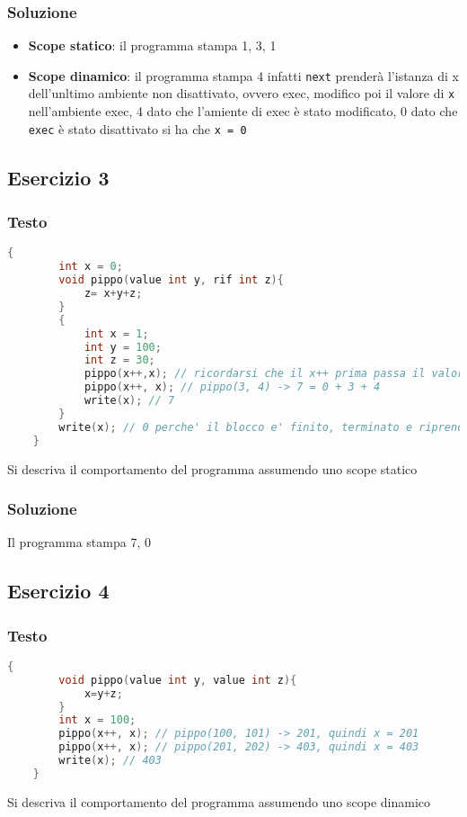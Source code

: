\subsubsection{Soluzione}
\begin{itemize}
    \item \textbf{Scope statico}: il programma stampa 1, 3, 1
    \item \textbf{Scope dinamico}: il programma stampa 4 infatti \texttt{next} prenderà l'istanza di x dell'unltimo ambiente non disattivato, ovvero exec, modifico poi il valore di \texttt{x} nell'ambiente exec, 4 dato che l'amiente di exec è stato modificato, 0 dato che \texttt{exec} è stato disattivato si ha che \texttt{x = 0}
\end{itemize}

\subsection{Esercizio 3}
\subsubsection{Testo}
\begin{lstlisting}[language=C]
    {
        int x = 0;
        void pippo(value int y, rif int z){
            z= x+y+z;
        }
        {
            int x = 1;
            int y = 100;
            int z = 30;
            pippo(x++,x); // ricordarsi che il x++ prima passa il valore di x nudo e crudo poi come side-effect modica x staticamente in questo caso, pertanto il secondo parametro sara' 2: pippo(1, 2) -> 3 = 0+ 1 +2
            pippo(x++, x); // pippo(3, 4) -> 7 = 0 + 3 + 4
            write(x); // 7
        }
        write(x); // 0 perche' il blocco e' finito, terminato e riprende la variabile x dichiarata all'inizio
    }
\end{lstlisting}
Si descriva il comportamento del programma assumendo uno scope statico

\subsubsection{Soluzione}
Il programma stampa 7, 0

\subsection{Esercizio 4}
\subsubsection{Testo}
\begin{lstlisting}[language=C]
    {
        void pippo(value int y, value int z){
            x=y+z;
        }
        int x = 100;
        pippo(x++, x); // pippo(100, 101) -> 201, quindi x = 201
        pippo(x++, x); // pippo(201, 202) -> 403, quindi x = 403
        write(x); // 403
    }
\end{lstlisting}
Si descriva il comportamento del programma assumendo uno scope dinamico

